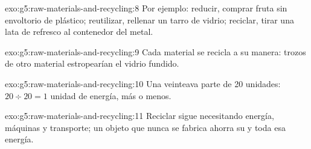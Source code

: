 \begin{solution}{exo:g5:raw-materials-and-recycling:8}
Por ejemplo: reducir, comprar fruta sin envoltorio de plástico;
reutilizar, rellenar un tarro de vidrio; reciclar, tirar una lata de
refresco al contenedor del metal.
\end{solution}

\begin{solution}{exo:g5:raw-materials-and-recycling:9}
Cada material se recicla a su manera: trozos de otro material
estropearían el vidrio fundido.
\end{solution}

\begin{solution}{exo:g5:raw-materials-and-recycling:10}
Una veinteava parte de 20 unidades: $20 \div 20 = 1$ unidad de energía,
más o menos.
\end{solution}

\begin{solution}{exo:g5:raw-materials-and-recycling:11}
Reciclar sigue necesitando energía, máquinas y transporte; un objeto
que nunca se fabrica ahorra su  y toda esa energía.
\end{solution}
